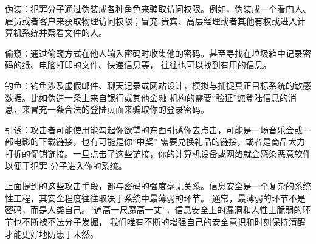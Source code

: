 \startitemize
\item 伪装：犯罪分子通过伪装成各种角色来骗取访问权限。例如，伪装成一个看门人、雇员或者客户来获取物理访问权限；冒充
贵宾、高层经理或者其他有权或进入计算机系统并察看文件的人。
\item 偷窥：通过偷窥方式在他人输入密码时收集他的密码。甚至寻找在垃圾箱中记录密码的纸、电脑打印的文件、快递信息等，
往往也可以找到有用的信息。
\item 钓鱼：钓鱼涉及虚假邮件、聊天记录或网站设计，模拟与捕捉真正目标系统的敏感数据。比如伪造一条上来自银行或其他金融
机构的需要“验证”您登陆信息的消息，来冒充一条合法的登陆页面来骗取你的登录密码。
\item 引诱：攻击者可能使用能勾起你欲望的东西引诱你去点击，可能是一场音乐会或一部电影的下载链接，也有可能是你“中奖”
需要兑换礼品的链接，或者是商品大力打折的促销链接。一旦点击了这些链接，你的计算机设备或网络就会感染恶意软件以便于犯罪
分子进入你的系统。
\stopitemize

上面提到的这些攻击手段，都与密码的强度毫无关系。信息安全是一个复杂的系统性工程，其安全程度往往取决于系统中最薄弱的环节。
通常，最薄弱的环节不是密码，而是人类自己。“道高一尺魔高一丈”，信息安全上的漏洞和人性上脆弱的环节也不断被不法分子发掘，
我们唯有不断的增强自己的安全意识和时刻保持清醒才能更好地防患于未然。
\stopsection